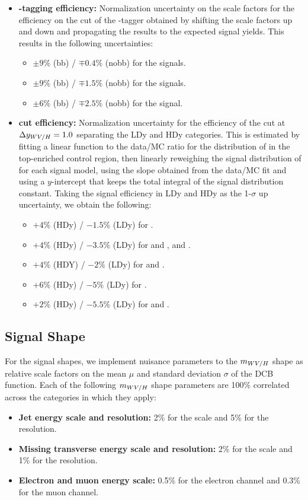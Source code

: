 \begin{itemize}
\begin{itemize}
  \end{itemize}
  \item {\bfseries \bbbar-tagging efficiency:} Normalization uncertainty on the scale factors for the efficiency on the cut of the \bbbar-tagger obtained by shifting the scale factors up and down and propagating the results to the expected signal yields.
  This results in the following uncertainties:
  \begin{itemize}
    \item $\pm9\%$ (bb) / $\mp0.4\%$ (nobb) for the \WW signals.
    \item $\pm9\%$ (bb) / $\mp1.5\%$ (nobb) for the \WZ signals.
    \item $\pm6\%$ (bb) / $\mp2.5\%$ (nobb) for the \WH signal.
  \end{itemize}
  \item {\bfseries \Dy cut efficiency:} Normalization uncertainty for the efficiency of the cut at $\Delta y_{WV/H}=1.0$ separating the LDy and HDy categories.
  This is estimated by fitting a linear function to the data/MC ratio for the distribution of \Dy in the top-enriched control region, then linearly reweighing the signal distribution of \Dy for each signal model, using the slope obtained from the data/MC fit and using a $y$-intercept that keeps the total integral of the signal distribution constant.
  Taking the signal efficiency in LDy and HDy as the 1-$\sigma$ up uncertainty, we obtain the following:
  \begin{itemize}
    \item $+4\%$ (HDy) / $-1.5\%$ (LDy) for \ggF\GBulktoWW.
    \item $+4\%$ (HDy) / $-3.5\%$ (LDy) for \ggF and \VBF\RadtoWW, and \DY\ZprtoWW.
    \item $+4\%$ (HDY) / $-2\%$ (LDy) for \DY\WprtoWZ and \WprtoWH.
    \item $+6\%$ (HDy) / $-5\%$ (LDy) for \VBF\GBulktoWW.
    \item $+2\%$ (HDy) / $-5.5\%$ (LDy) for \VBF\ZprtoWW and \WprtoWZ.
  \end{itemize}
\end{itemize}

\subsection{Signal Shape}

For the signal shapes, we implement nuisance parameters to the $m_{WV/H}$ shape as relative scale factors on the mean $\mu$ and standard deviation $\sigma$ of the DCB function.
Each of the following $m_{WV/H}$ shape parameters are 100\% correlated across the categories in which they apply:
\begin{itemize}
  \item {\bfseries Jet energy scale and resolution:} 2\% for the scale and 5\% for the resolution.
  \item {\bfseries Missing transverse energy scale and resolution:} 2\% for the scale and 1\% for the resolution.
  \item {\bfseries Electron and muon energy scale:} 0.5\% for the electron channel and 0.3\% for the muon channel.
\end{itemize}

